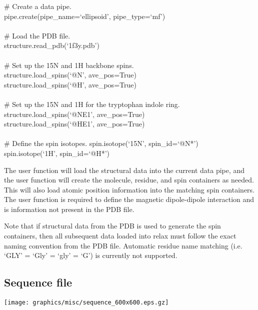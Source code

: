 \begin{exampleenv}
\# Create a data pipe. \\
pipe.create(pipe\_name=`ellipsoid', pipe\_type=`mf') \\
 \\
\# Load the PDB file. \\
structure.read\_pdb(`1f3y.pdb') \\
 \\
\# Set up the 15N and 1H backbone spins. \\
structure.load\_spins(`@N', ave\_pos=True) \\
structure.load\_spins(`@H', ave\_pos=True) \\
 \\
\# Set up the 15N and 1H for the tryptophan indole ring. \\
structure.load\_spins(`@NE1', ave\_pos=True) \\
structure.load\_spins(`@HE1', ave\_pos=True) \\
 \\
\# Define the spin isotopes.
spin.isotope(`15N', spin\_id=`@N*') \\
spin.isotope(`1H', spin\_id=`@H*')
\end{exampleenv}

The  user function will load the structural data into the current data pipe, and the  user function will create the molecule, residue, and spin containers as needed.  This will also load atomic position information into the matching spin containers.  The  user function is required to define the magnetic dipole-dipole interaction and is information not present in the PDB file.

Note that if structural data from the PDB is used to generate the spin containers, then all subsequent data loaded into relax must follow the exact naming convention from the PDB file.  Automatic residue name matching (i.e. `GLY' = `Gly' = `gly' = `G') is currently not supported.




\subsection{Sequence file} \label{sect: script - sequence file}

\begin{figure*}[h]
\texttt{[image: graphics/misc/sequence\_600x600.eps.gz]}
\end{figure*}


